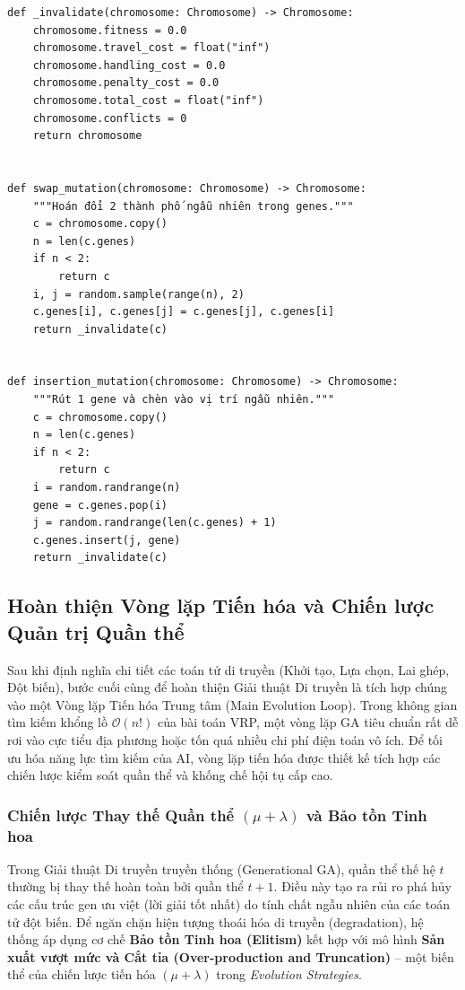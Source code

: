 \documentclass[12pt,a4paper]{article}
\numberwithin{figure}{subsection}
\begin{document}
\begin{verbatim}
def _invalidate(chromosome: Chromosome) -> Chromosome:
    chromosome.fitness = 0.0
    chromosome.travel_cost = float("inf")
    chromosome.handling_cost = 0.0
    chromosome.penalty_cost = 0.0
    chromosome.total_cost = float("inf")
    chromosome.conflicts = 0
    return chromosome


def swap_mutation(chromosome: Chromosome) -> Chromosome:
    """Hoán đổi 2 thành phố ngẫu nhiên trong genes."""
    c = chromosome.copy()
    n = len(c.genes)
    if n < 2:
        return c
    i, j = random.sample(range(n), 2)
    c.genes[i], c.genes[j] = c.genes[j], c.genes[i]
    return _invalidate(c)


def insertion_mutation(chromosome: Chromosome) -> Chromosome:
    """Rút 1 gene và chèn vào vị trí ngẫu nhiên."""
    c = chromosome.copy()
    n = len(c.genes)
    if n < 2:
        return c
    i = random.randrange(n)
    gene = c.genes.pop(i)
    j = random.randrange(len(c.genes) + 1)
    c.genes.insert(j, gene)
    return _invalidate(c)
\end{verbatim}
\subsection{Hoàn thiện Vòng lặp Tiến hóa và Chiến lược Quản trị Quần thể}

Sau khi định nghĩa chi tiết các toán tử di truyền (Khởi tạo, Lựa chọn, Lai ghép, Đột biến), bước cuối cùng để hoàn thiện Giải thuật Di truyền là tích hợp chúng vào một Vòng lặp Tiến hóa Trung tâm (Main Evolution Loop). Trong không gian tìm kiếm khổng lồ $\mathcal{O}(n!)$ của bài toán VRP, một vòng lặp GA tiêu chuẩn rất dễ rơi vào cực tiểu địa phương hoặc tốn quá nhiều chi phí điện toán vô ích. Để tối ưu hóa năng lực tìm kiếm của AI, vòng lặp tiến hóa được thiết kế tích hợp các chiến lược kiểm soát quần thể và khống chế hội tụ cấp cao.

\subsubsection{Chiến lược Thay thế Quần thể $(\mu + \lambda)$ và Bảo tồn Tinh hoa}

Trong Giải thuật Di truyền truyền thống (Generational GA), quần thể thế hệ $t$ thường bị thay thế hoàn toàn bởi quần thể $t+1$. Điều này tạo ra rủi ro phá hủy các cấu trúc gen ưu việt (lời giải tốt nhất) do tính chất ngẫu nhiên của các toán tử đột biến. Để ngăn chặn hiện tượng thoái hóa di truyền (degradation), hệ thống áp dụng cơ chế \textbf{Bảo tồn Tinh hoa (Elitism)} kết hợp với mô hình \textbf{Sản xuất vượt mức và Cắt tỉa (Over-production and Truncation)} – một biến thể của chiến lược tiến hóa $(\mu + \lambda)$ trong \textit{Evolution Strategies}.
\end{document}
